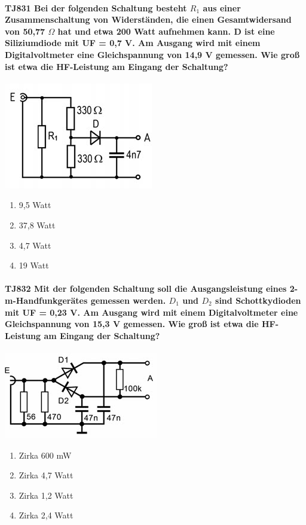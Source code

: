\documentclass[8pt]{article}
\begin{document}
\paragraph*{TJ831 Bei der folgenden Schaltung besteht $R_{1}$ aus einer Zusammenschaltung von Widerständen, die einen Gesamtwidersand von 50,77 $\Omega$ hat und etwa 200 Watt aufnehmen kann. D ist eine Siliziumdiode mit UF = 0,7 V. Am Ausgang wird mit einem Digitalvoltmeter eine Gleichspannung von 14,9 V gemessen. Wie groß ist etwa die HF-Leistung am Eingang der Schaltung?}
\begin{center}
	\begin{minipage}{\linewidth}
		\centering
		\includegraphics[scale=1.0]{pics/tj831_a.jpg}
	\end{minipage}
\end{center}
\begin{enumerate}[nolistsep,label=\Alph*]
\item 9,5 Watt
\item 37,8 Watt
\item 4,7 Watt
\item 19 Watt
\end{enumerate}

\paragraph*{TJ832 Mit der folgenden Schaltung soll die Ausgangsleistung eines 2-m-Handfunkgerätes gemessen werden. $D_{1}$ und $D_{2}$ sind Schottkydioden mit UF = 0,23 V. Am Ausgang wird mit einem Digitalvoltmeter eine Gleichspannung von 15,3 V gemessen. Wie groß ist etwa die HF-Leistung am Eingang der Schaltung?}
\begin{center}
	\begin{minipage}{\linewidth}
		\centering
		\includegraphics[scale=1.0]{pics/tj832_a.jpg}
	\end{minipage}
\end{center}
\begin{enumerate}[nolistsep,label=\Alph*]
\item Zirka 600 mW
\item Zirka 4,7 Watt
\item Zirka 1,2 Watt
\item Zirka 2,4 Watt
\end{enumerate}
\end{document}
